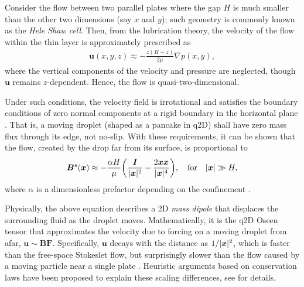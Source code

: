 \medskip
Consider the flow between two parallel plates where the gap $H$ is much smaller than the other two dimensions (say $x$ and $y$); such geometry is commonly known as the \emph{Hele Shaw cell}. Then, from the lubrication theory, the velocity of the flow within the thin layer is approximately prescribed as 
 \begin{equation} \label{eq:hele-shaw}
  \begin{aligned}
    {\bm u}(x,y,z) \approx -\frac{z(H-z)}{2\mu} \nabla p(x,y),
  \end{aligned}
 \end{equation}
where the vertical components of the velocity and pressure are neglected, though ${\bm u}$ remains $z$-dependent. Hence, the flow is quasi-two-dimensional.

Under such conditions, the velocity field is irrotational and satisfies the boundary conditions of zero normal components at a rigid boundary in the horizontal plane \citep{Batchelor}. That is, a moving droplet (shaped as a pancake in q2D) shall have zero mass flux through its edge, not no-slip. With these requirements, it can be shown that the flow, created by the drop far from its surface, is proportional to
\begin{equation} \label{eq:dipolar}
 \begin{aligned}
   {\bm B}^s({\bm x}) \approx -\frac{\alpha H}{\mu} \bigg( \frac{{\bm I}}{\lvert\bm x\rvert^2} -\frac{ 2{\bm x}{\bm x} }{ \lvert{\bm x}\rvert^4} \bigg),
   \quad \textrm{for} \quad \lvert\bm x\rvert \gg H,
 \end{aligned}
\end{equation}
where $\alpha$ is a dimensionless prefactor depending on the confinement \citep{Diamant}.

Physically, the above equation describes a 2D \emph{mass dipole} that displaces the surrounding fluid as the droplet moves.
Mathematically, it is the q2D Oseen tensor that approximates the velocity due to forcing on a moving droplet from afar, \ie ${\bm u} \sim {\bm B}{\bm F}$.
Specifically, ${\bm u}$ decays with the distance as $1/\lvert\bm x\rvert^2$, which is faster than the free-space Stokeslet flow, but surprisingly slower than the flow caused by a moving particle near a single plate \citep{Cui2004}.
Heuristic arguments based on conservation laws have been proposed to explain these scaling differences, see \cite{Diamant} for details.

